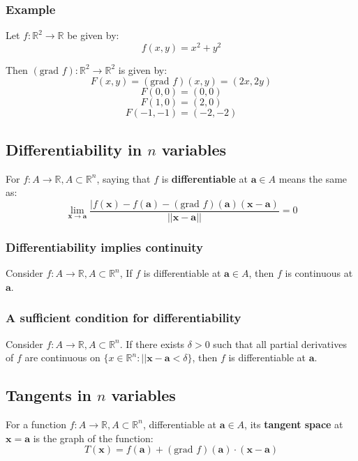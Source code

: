 \documentclass[11pt]{article}
\begin{document}
\subsubsection{Example}
\label{sec:org9bcc191}
Let \(f : \mathbb{R}^2 \rightarrow \mathbb{R}\) be given by:
\[f(x, y) = x^2 + y^2\]

Then \((\text{grad } f) : \mathbb{R}^2 \rightarrow \mathbb{R}^2\) is given by:
\[F(x, y) = (\text{grad } f)(x, y) = (2x, 2y)\]
\[F(0, 0) = (0, 0)\]
\[F(1, 0) = (2, 0)\]
\[F(-1, -1) = (-2, -2)\]
\subsection{Differentiability in \(n\) variables}
\label{sec:org247d7f0}
For \(f : A \rightarrow \mathbb{R}, A \subset \mathbb{R}^n\), saying that \(f\) is \textbf{differentiable} at \(\boldsymbol{a} \in A\) means the same as:
\[\lim_{\boldsymbol{x} \rightarrow \boldsymbol{a}} \frac{|f(\boldsymbol{x}) - f(\boldsymbol{a}) - (\text{grad } f)(\boldsymbol{a})(\boldsymbol{x} - \boldsymbol{a})}{||\boldsymbol{x} - \boldsymbol{a}||} = 0\]
\subsubsection{Differentiability implies continuity}
\label{sec:org7677972}
Consider \(f : A \rightarrow \mathbb{R}, A \subset \mathbb{R}^n\), If \(f\) is differentiable at \(\boldsymbol{a} \in A\), then \(f\) is continuous at \(\boldsymbol{a}\).
\subsubsection{A sufficient condition for differentiability}
\label{sec:org8db3091}
Consider \(f : A \rightarrow \mathbb{R}, A \subset \mathbb{R}^n\). If there exists \(\delta > 0\) such that all partial derivatives of \(f\) are continuous on \(\{x \in \mathbb{R}^n: ||\boldsymbol{x} - \boldsymbol{a} < \delta\}\), then \(f\) is differentiable at \(\boldsymbol{a}\).
\subsection{Tangents in \(n\) variables}
\label{sec:org01ad9a0}
For a function \(f : A \rightarrow \mathbb{R}, A \subset \mathbb{R}^n\), differentiable at \(\boldsymbol{a} \in A\), its \textbf{tangent space} at \(\boldsymbol{x} = \boldsymbol{a}\) is the graph of the function:
\[T(\boldsymbol{x}) = f(\boldsymbol{a}) + (\text{grad } f)(\boldsymbol{a}) \cdot (\boldsymbol{x} - \boldsymbol{a})\]
\end{document}
